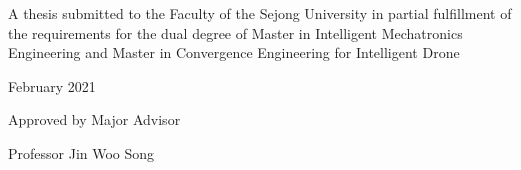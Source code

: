 \documentclass[
11pt, %
english, %
doublespacing, %
liststotoc, %
headsepline, %
]{MastersDoctoralThesis} %
\begin{document}
\begin{titlepage}
	\begin{center}
		
		\vspace*{.01\textheight}
		
		{\bfseries \fontsize{21}{20}\selectfont \ttitle\par}\vspace{3cm} 
		
		{\fontsize{16}{12}\selectfont \authorname\par}\vspace{2cm} 
		
		{\fontsize{14}{12}\selectfont A thesis submitted to the Faculty of the Sejong University in partial fulfillment of the requirements for the dual degree of Master in Intelligent Mechatronics Engineering and Master in Convergence Engineering for Intelligent Drone\par}\vspace{2cm} 
		
		{\fontsize{14}{12}\selectfont February 2021\par}\vspace{2cm} 
		
		{\fontsize{14}{12}\selectfont Approved by Major Advisor \par
			Professor Jin Woo Song}\vspace{2cm} 
		
		\vfill
	\end{center}
\end{titlepage}


\end{document}
